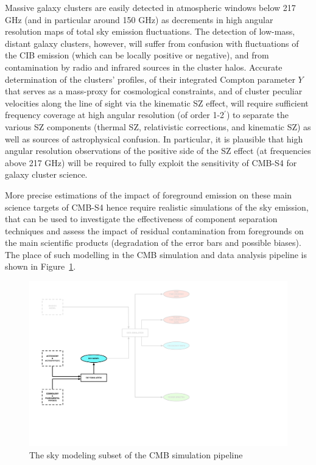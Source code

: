 Massive galaxy clusters are easily detected in atmospheric windows below 217 GHz (and in particular around 150 GHz) as decrements in high angular resolution maps of total sky emission fluctuations. The detection of low-mass, distant galaxy clusters, however, will suffer from confusion with fluctuations of the CIB emission (which can be locally positive or negative), and from contamination by radio and infrared sources in the cluster halos. Accurate determination of the clusters' profiles, of their integrated Compton parameter $Y$ that serves as a mass-proxy for cosmological constraints, and of cluster peculiar velocities along the line of sight via the kinematic SZ effect, will require sufficient frequency coverage at high angular resolution (of order 1-2$^\prime$) to separate the various SZ components (thermal SZ, relativistic corrections, and kinematic SZ) as well as sources of astrophysical confusion. In particular, it is plausible that high angular resolution observations of the positive side of the SZ effect (at frequencies above 217 GHz) will be required to fully exploit the sensitivity of CMB-S4 for galaxy cluster science.

More precise estimations of the impact of foreground emission on these main science targets of CMB-S4 hence require realistic simulations of the sky emission, that can be used to investigate the effectiveness of component separation techniques and assess the impact of residual contamination from foregrounds on the main scientific products (degradation of the error bars and possible biases). The place of such modelling in the CMB simulation and data analysis pipeline is shown in Figure~\ref{fig:skymodel-in-pipeline}.

\begin{figure}[htbp]
\centering
\includegraphics[width=1\textwidth]{Analysis/sm}
\caption{The sky modeling subset of the CMB simulation pipeline}
\label{fig:skymodel-in-pipeline}
\end{figure}

